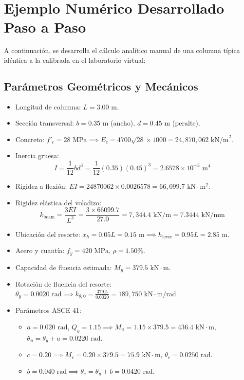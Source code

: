 \documentclass[11pt,letterpaper]{article}
\begin{document}
\section{Ejemplo Numérico Desarrollado Paso a Paso}

A continuación, se desarrolla el cálculo analítico manual de una columna típica idéntica a la calibrada en el laboratorio virtual:

\subsection{Parámetros Geométricos y Mecánicos}
\begin{itemize}
    \item Longitud de columna: $L = 3.00\text{ m}$.
    \item Sección transversal: $b = 0.35\text{ m}$ (ancho), $d = 0.45\text{ m}$ (peralte).
    \item Concreto: $f'_c = 28\text{ MPa} \implies E_c = 4700 \sqrt{28} \times 1000 = 24,870,062\text{ kN/m}^2$.
    \item Inercia gruesa:
    \begin{equation}
    I = \frac{1}{12} b d^3 = \frac{1}{12} (0.35) (0.45)^3 = 2.6578 \times 10^{-3}\text{ m}^4
    \end{equation}
    \item Rigidez a flexión: $E I = 24870062 \times 0.0026578 = 66,099.7\text{ kN}\cdot\text{m}^2$.
    \item Rigidez elástica del voladizo:
    \begin{equation}
    k_{\text{beam}} = \frac{3 E I}{L^3} = \frac{3 \times 66099.7}{27.0} = 7,344.4\text{ kN/m} = 7.3444\text{ kN/mm}
    \end{equation}
    \item Ubicación del resorte: $x_h = 0.05 L = 0.15\text{ m} \implies h_{\text{lever}} = 0.95 L = 2.85\text{ m}$.
    \item Acero y cuantía: $f_y = 420\text{ MPa}$, $\rho = 1.50\%$.
    \item Capacidad de fluencia estimada: $M_y = 379.5\text{ kN}\cdot\text{m}$.
    \item Rotación de fluencia del resorte: $\theta_y = 0.0020\text{ rad} \implies k_{\theta,0} = \frac{379.5}{0.0020} = 189,750\text{ kN}\cdot\text{m/rad}$.
    \item Parámetros ASCE 41:
    \begin{itemize}
        \item $a = 0.020\text{ rad}$, $Q_y = 1.15 \implies M_u = 1.15 \times 379.5 = 436.4\text{ kN}\cdot\text{m}$, $\theta_u = \theta_y + a = 0.0220\text{ rad}$.
        \item $c = 0.20 \implies M_r = 0.20 \times 379.5 = 75.9\text{ kN}\cdot\text{m}$, $\theta_r = 0.0250\text{ rad}$.
        \item $b = 0.040\text{ rad} \implies \theta_e = \theta_y + b = 0.0420\text{ rad}$.
    \end{itemize}
\end{itemize}
\end{document}
